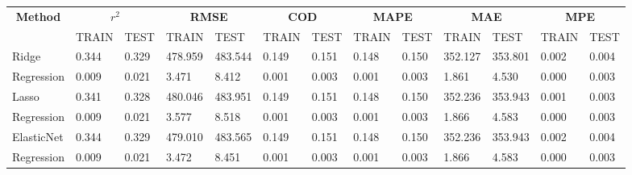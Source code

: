 \documentclass{article}
\begin{document}
\def\arraystretch{1.8}
\scriptsize{
\begin{longtable}[c]{|p{2.3cm}|ll|ll|ll|ll|ll|ll|}
  \hline
  \multicolumn{1}{|c|}{\multirow{2}{*}{\textbf{Method}}}      & \multicolumn{2}{c|}{$r^2$}            & \multicolumn{2}{c|}{\textbf{RMSE}}              & \multicolumn{2}{c|}{\textbf{COD}}           & \multicolumn{2}{c|}{\textbf{MAPE}}          & \multicolumn{2}{c|}{\textbf{MAE}}               & \multicolumn{2}{c|}{\textbf{MPE}}             \\ \cline{2-13} 
  \multicolumn{1}{|c|}{}                             & \multicolumn{1}{l|}{TRAIN} & TEST  & \multicolumn{1}{l|}{TRAIN}   & TEST    & \multicolumn{1}{l|}{TRAIN} & TEST  & \multicolumn{1}{l|}{TRAIN} & TEST  & \multicolumn{1}{l|}{TRAIN}   & TEST    & \multicolumn{1}{l|}{TRAIN}  & TEST   \\ \hline
  \endhead
  Ridge                 & \multicolumn{1}{l|}{0.344} & 0.329 & \multicolumn{1}{l|}{478.959} & 483.544 & \multicolumn{1}{l|}{0.149} & 0.151 & \multicolumn{1}{l|}{0.148} & 0.150 & \multicolumn{1}{l|}{352.127} & 353.801 & \multicolumn{1}{l|}{0.002}  & 0.004  \\
  Regression& \multicolumn{1}{l|}{0.009} & 0.021 & \multicolumn{1}{l|}{3.471}   & 8.412   & \multicolumn{1}{l|}{0.001} & 0.003 & \multicolumn{1}{l|}{0.001} & 0.003 & \multicolumn{1}{l|}{1.861}   & 4.530   & \multicolumn{1}{l|}{0.000}  & 0.003  \\ \hline
  Lasso                  & \multicolumn{1}{l|}{0.341} & 0.328 & \multicolumn{1}{l|}{480.046} & 483.951 & \multicolumn{1}{l|}{0.149} & 0.151 & \multicolumn{1}{l|}{0.148} & 0.150 & \multicolumn{1}{l|}{352.236} & 353.943 & \multicolumn{1}{l|}{0.001}  & 0.003  \\
  Regression & \multicolumn{1}{l|}{0.009} & 0.021 & \multicolumn{1}{l|}{3.577}   & 8.518   & \multicolumn{1}{l|}{0.001} & 0.003 & \multicolumn{1}{l|}{0.001} & 0.003 & \multicolumn{1}{l|}{1.866}   & 4.583   & \multicolumn{1}{l|}{0.000}  & 0.003  \\ \hline
  ElasticNet            & \multicolumn{1}{l|}{0.344} & 0.329 & \multicolumn{1}{l|}{479.010} & 483.565 & \multicolumn{1}{l|}{0.149} & 0.151 & \multicolumn{1}{l|}{0.148} & 0.150 & \multicolumn{1}{l|}{352.236} & 353.943 & \multicolumn{1}{l|}{0.002}  & 0.004  \\
  Regression& \multicolumn{1}{l|}{0.009} & 0.021 & \multicolumn{1}{l|}{3.472}   & 8.451   & \multicolumn{1}{l|}{0.001} & 0.003 & \multicolumn{1}{l|}{0.001} & 0.003 & \multicolumn{1}{l|}{1.866}   & 4.583   & \multicolumn{1}{l|}{0.000}  & 0.003  \\ \hline

\end{longtable}}
\end{document}
